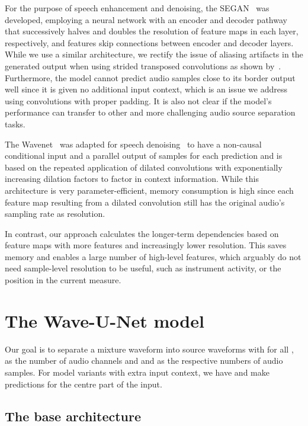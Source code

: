 \documentclass{article}
\begin{document}
For the purpose of speech enhancement and denoising, the SEGAN~\cite{Pascual2017} was developed, employing a neural network with an encoder and decoder pathway that successively halves and doubles the resolution of feature maps in each layer, respectively, and features skip connections between encoder and decoder layers. While we use a similar architecture, we rectify the issue of aliasing artifacts in the generated output when using strided transposed convolutions as shown by~\cite{Odena2016}.
Furthermore, the model cannot predict audio samples close to its border output well since it is given no additional input context, which is an issue we address using convolutions with proper padding.
It is also not clear if the model's performance can transfer to other and more challenging audio source separation tasks.

The Wavenet~\cite{Dieleman2016} was adapted for speech denoising~\cite{Rethage2017} to have a non-causal conditional input and a parallel output of samples for each prediction and is based on the repeated application of dilated convolutions with exponentially increasing dilation factors to factor in context information.
While this architecture is very parameter-efficient, memory consumption is high since each feature map resulting from a dilated convolution still has the original audio's sampling rate as resolution.

In contrast, our approach calculates the longer-term dependencies based on feature maps with more features and increasingly lower resolution. This saves memory and enables a large number of high-level features, which arguably do not need sample-level resolution to be useful, such as instrument activity, or the position in the current measure.

\section{The Wave-U-Net model}
\label{sec:model}

Our goal is to separate a mixture waveform  into  source waveforms  with  for all ,  as the number of audio channels and  and  as the respective numbers of audio samples.
For model variants with extra input context, we have  and make predictions for the centre part of the input.


\subsection{The base architecture}
\label{sec:model_base}
\end{document}
